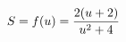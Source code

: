 \documentclass[preview]{standalone}
\begin{document}
\begin{align*}
\special{dvisvgm:raw <g id='unique000'>}S=f(u)=\frac{2(u+2)}{u^2+4}\special{dvisvgm:raw </g>}
\end{align*}
\end{document}
